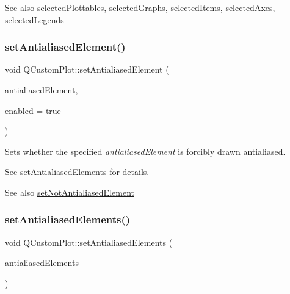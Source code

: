 \begin{DoxySeeAlso}{See also}
\mbox{\hyperlink{class_q_custom_plot_a747faaab57c56891e901a1e97fa4359a}{selected\+Plottables}}, \mbox{\hyperlink{class_q_custom_plot_ad3547aded026d8a9ae6ef13a69080d06}{selected\+Graphs}}, \mbox{\hyperlink{class_q_custom_plot_afda487bcf2d6cf1a57173d82495e29ba}{selected\+Items}}, \mbox{\hyperlink{class_q_custom_plot_a7e6b07792b1cb2c31681596582d14dbe}{selected\+Axes}}, \mbox{\hyperlink{class_q_custom_plot_ac87624ddff1cbf4064781a8e8ae321c4}{selected\+Legends}} 
\end{DoxySeeAlso}
\mbox{\label{class_q_custom_plot_aeef813bcf7efab8e765f9f87ec454691}} 
\subsubsection{\texorpdfstring{set\+Antialiased\+Element()}{setAntialiasedElement()}}
{\footnotesize\ttfamily void Q\+Custom\+Plot\+::set\+Antialiased\+Element (\begin{DoxyParamCaption}\item[{\mbox{\hyperlink{namespace_q_c_p_ae55dbe315d41fe80f29ba88100843a0c}{Q\+C\+P\+::\+Antialiased\+Element}}}]{antialiased\+Element,  }\item[{bool}]{enabled = {\ttfamily true} }\end{DoxyParamCaption})}

Sets whether the specified {\itshape antialiased\+Element} is forcibly drawn antialiased.

See \mbox{\hyperlink{class_q_custom_plot_af6f91e5eab1be85f67c556e98c3745e8}{set\+Antialiased\+Elements}} for details.

\begin{DoxySeeAlso}{See also}
\mbox{\hyperlink{class_q_custom_plot_afc657938a707c890e449ae89203a076d}{set\+Not\+Antialiased\+Element}} 
\end{DoxySeeAlso}
\mbox{\label{class_q_custom_plot_af6f91e5eab1be85f67c556e98c3745e8}} 
\subsubsection{\texorpdfstring{set\+Antialiased\+Elements()}{setAntialiasedElements()}}
{\footnotesize\ttfamily void Q\+Custom\+Plot\+::set\+Antialiased\+Elements (\begin{DoxyParamCaption}\item[{const Q\+C\+P\+::\+Antialiased\+Elements \&}]{antialiased\+Elements }\end{DoxyParamCaption})}

